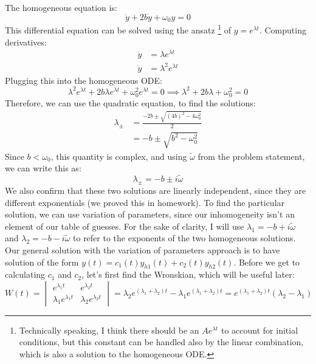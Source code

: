 \documentclass[10pt]{article}
\begin{document}
\begin{enumerate}[label=\alph*)]
			\begin{solution}
				The homogeneous equation is:
				\[
				\ddot y + 2b\dot y + \omega_0y = 0
				\] 
				This differential equation can be solved using the ansatz \footnote{
					Technically speaking, I think there should be an $Ae^{\lambda t}$ to account for 
				initial conditions, but this constant can be handled also by the linear combination, which 
			is also a solution to the homogeneous ODE.} of 
				$y = e^{\lambda t}$.  Computing
				derivatives:
				\begin{align*}
					\dot y &= \lambda e^{\lambda t}\\
					\ddot y &= \lambda^2 e^{\lambda t}
				\end{align*}
				Plugging this into the homogeneous ODE:
				\[
					\lambda^2 e^{\lambda t} + 2b \lambda e^{\lambda t} + \omega_0^2 e^{\lambda t} = 0 \implies
					\lambda^2 + 2b \lambda + \omega_0^2 = 0
				\] 
				Therefore, we can use the quadratic equation, to find the solutions:
				\begin{align*}
					\lambda_{\pm} &= \frac{-2b \pm \sqrt{(4b)^2 - 4 \omega_0^2} }{2} \\
					&= -b \pm \sqrt{b^2 - \omega_0^2}  
				\end{align*}
				Since $b < \omega_0$, this quantity is complex, and using $\widetilde \omega$ from the problem
				statement, we can write this as:
				\[
				\lambda_\pm = -b \pm i \widetilde \omega
				\] 
				We also confirm that these two solutions are linearly independent, since they are different
				exponentials (we proved this in homework). To find the particular solution, we can use 
				variation of parameters, since our inhomogeneity isn't an element of our table of 
				guesses. For the sake of clarity, I will use $\lambda_1 = -b + i \widetilde \omega$ and
				$\lambda_2 = -b - i \widetilde \omega$
				to refer to the exponents of the two homogeneous solutions. Our general solution 
				with the variation of parameters approach is to have solution of the form 
				$y(t) = c_1(t)y_{h 1}(t) + c_2(t) y_{h 2}(t)$. Before we get to calculating $c_1$ and $c_2$, 
				let's first find the Wronskian, which will be useful later:
				\[
					W(t) = \begin{vmatrix} e^{\lambda_1 t} & e^{\lambda_2 t}\\ \lambda_1e^{\lambda_1 t} & 
					\lambda_2e^{\lambda_2 t} \end{vmatrix} = \lambda_2e^{(\lambda_1 + \lambda_2) t} -
					\lambda_1e^{(\lambda_1 + \lambda_2)t} = e^{(\lambda_1 + \lambda_2) t}(\lambda_2 - \lambda_1)
\]
\end{solution}
\end{enumerate}
\end{document}
